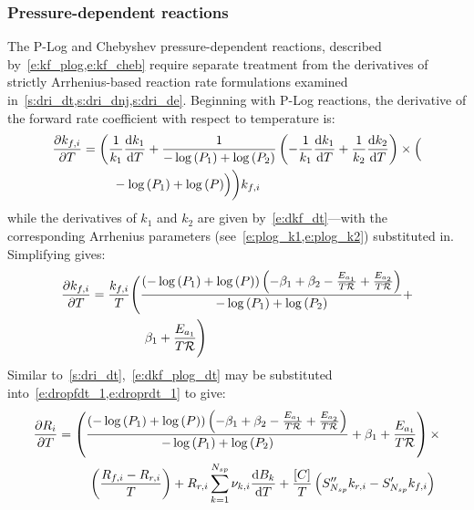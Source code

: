\documentclass[12pt,number,sort&compress]{elsarticle}
\newcommand{\ns}{N_{sp}}
\newcommand{\Ru}{\mathcal{R}}
\begin{document}
\subsubsection{Pressure-dependent reactions}
\label{s:dri_pdep}
The P-Log and Chebyshev pressure-dependent reactions, described by~\cref{e:kf_plog,e:kf_cheb} require separate treatment from the derivatives of strictly Arrhenius-based reaction rate formulations examined in~\cref{s:dri_dt,s:dri_dnj,s:dri_de}.
Beginning with P-Log reactions, the derivative of the forward rate coefficient with respect to temperature is:
\begin{align}
 \frac{\partial {k_{f, i}} }{\partial T } &= \biggl( \frac{1}{k_{1}} \frac{\text{d} k_1 }{\text{d} T } + \frac{1}{- \log{\left (P_{1} \right )} + \log{\left (P_{2} \right )}} \left(- \frac{1}{k_{1}} \frac{\text{d} k_1 }{\text{d} T } + \frac{1}{k_{2}} \frac{\text{d} k_2 }{\text{d} T }\right) \times  \Bigl( \nonumber \\
					 & \mathindent - \log{\left (P_{1} \right )} + \log{\left (P \right )}\Bigr)\biggr) {k_{f, i}}
\end{align}
while the derivatives of $k_{1}$ and $k_{2}$ are given by~\cref{e:dkf_dt}---with the corresponding Arrhenius parameters (see~\cref{e:plog_k1,e:plog_k2}) substituted in.
Simplifying gives:
\begin{align}
 \label{e:dkf_plog_dt}
 \frac{\partial {k_{f, i}} }{\partial T } &= \frac{{k_{f, i}}}{T} \Biggl(\frac{\left(- \log{\left (P_{1} \right )} + \log{\left (P \right )}\right) \left(- \beta_1 + \beta_2 - \frac{E_{a_1}}{T \Ru} + \frac{E_{a_2}}{T \Ru}\right)}{- \log{\left (P_{1} \right )} + \log{\left (P_{2} \right )}} + \nonumber \\
					 & \mathindent[morespac] \beta_1 + \frac{E_{a_1}}{T \Ru}\Biggr)
\end{align}
Similar to~\cref{s:dri_dt},~\cref{e:dkf_plog_dt} may be substituted into~\cref{e:dropfdt_1,e:droprdt_1} to give:
\begin{align}
 \label{e:drop_plog_dT}
 \frac{\partial R_{i} }{\partial T } &= \left(\frac{\left(- \log{\left (P_{1} \right )} + \log{\left (P \right )}\right) \left(- \beta_1 + \beta_2 - \frac{E_{a_1}}{T \Ru} + \frac{E_{a_2}}{T \Ru}\right)}{- \log{\left (P_{1} \right )} + \log{\left (P_{2} \right )}} + \beta_1 + \frac{E_{a_1}}{T \Ru} \right) \times \nonumber \\
				     & \mathindent \left(\frac{{R_{f, i}} - {R_{r, i}}}{T}\right) + {R_{r, i}} \sum_{k=1}^{\ns} \nu_{k,i} \frac{\text{d} B_{k} }{\text{d} T } + \frac{[C]}{T} \left(S^{\prime\prime}_{\ns} {k_{r, i}} - S^{\prime}_{\ns} {k_{f, i}}\right)
\end{align}
\end{document}
